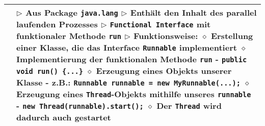 	\begin{longtable}{ | p{} p{} | }
	\hline
	
	
	\makecell[l]{Interface Runnable} & \makecell[l]{
	$\triangleright$ Aus Package \texttt{java.lang} \\
	$\triangleright$ Enthält den Inhalt des parallel laufenden Prozesses \\
	$\triangleright$ \texttt{Functional Interface} mit funktionaler Methode \texttt{run} \\
	$\triangleright$ Funktionsweise: \\
	\hspace{0.4cm} $\diamond$ Erstellung einer Klasse, die das Interface \texttt{Runnable} implementiert \\
	\hspace{0.4cm} $\diamond$ Implementierung der funktionalen Methode \texttt{run} \\
	\hspace{0.6cm} - \texttt{public void run() \{...\}} \\
	\hspace{0.4cm} $\diamond$ Erzeugung eines Objekts unserer Klasse \\
	\hspace{0.6cm} - z.B.: \texttt{Runnable runnable = new MyRunnable(...);} \\ 
	\hspace{0.4cm} $\diamond$ Erzeugung eines \texttt{Thread}-Objekts mithilfe unseres \texttt{runnable} \\
	\hspace{0.6cm} - \texttt{new Thread(runnable).start();} \\
	\hspace{0.4cm} $\diamond$ Der \texttt{Thread} wird dadurch auch gestartet} \\ \hline
		

\end{longtable}
